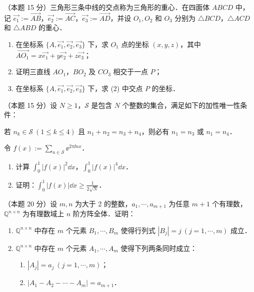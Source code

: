 
\begin{problems}

\item[一、]（本题 15 分）三角形三条中线的交点称为三角形的重心．在四面体 $ABCD$ 中，记 $\overrightarrow{e_1}:=\overrightarrow{AB}$，$\overrightarrow{e_2}:=\overrightarrow{AC}$，$\overrightarrow{e_3}:=\overrightarrow{AD}$，并设 $O_1,O_2$ 和 $O_3$ 分别为 $\triangle BCD$，$\triangle ACD$ 和 $\triangle ABD$ 的重心．
\begin{enumerate}[label=(\arabic*)]
  \item 在坐标系 $\{A,\overrightarrow{e_1},\overrightarrow{e_2},\overrightarrow{e_3}\}$ 下，求 $O_1$ 点的坐标 $(x,y,z)$，其中 $\overrightarrow{AO_1}=x\overrightarrow{e_1}+y\overrightarrow{e_2}+z\overrightarrow{e_3}$；
  \item 证明三直线 $AO_1$，$BO_2$ 及 $CO_3$ 相交于一点 $P$；
  \item 在坐标系 $\{A,\overrightarrow{e_1},\overrightarrow{e_2},\overrightarrow{e_3}\}$ 下，求 (2) 中交点 $P$ 的坐标．
\end{enumerate}

\item[二、]（本题 15 分）设 $N\geqslant 1$，$\mathcal{S}$ 是包含 $N$ 个整数的集合，满足如下的加性唯一性条件：

若 $n_k\in\mathcal{S}\ (1\leqslant k\leqslant 4)$ 且 $n_1+n_2=n_3+n_4$，则必有 $n_1=n_3$ 或 $n_1=n_4$．

令 $f(x):=\sum\limits_{n\in\mathcal{S}}\ee^{2\pi\ii nx}$．
\begin{enumerate}[label=(\arabic*)]
  \item 计算 $\displaystyle\int_0^1|f(x)|^2\dd x$，$\displaystyle\int_0^1|f(x)|^4\dd x$．
  \item 证明：$\displaystyle\int_0^1|f(x)|\dd x\geqslant\frac{1}{2\sqrt{N}}$．
\end{enumerate}

\item[三、]（本题 20 分）设 $m,n$ 为大于 2 的整数，$a_1,\cdots,a_{m+1}$ 为任意 $m+1$ 个有理数，$\mathbb{Q}^{n\times n}$ 为有理数域上 $n$ 阶方阵全体．证明：
\begin{enumerate}[label=(\arabic*)]
  \item $\mathbb{Q}^{n\times n}$ 中存在 $m$ 个元素 $B_1,\cdots,B_m$ 使得行列式 $|B_j|=j\ (j=1,\cdots,m)$ 成立．
  \item $\mathbb{Q}^{n\times n}$ 中存在 $m$ 个元素 $A_1,\cdots,A_m$ 使得下列两条同时成立：
  \begin{enumerate}[label=(\roman*)]
    \item $|A_j|=a_j\ (j=1,\cdots,m)$；
    \item $|A_1-A_2-\cdots-A_m|=a_{m+1}$．
  \end{enumerate}
\end{enumerate}


\end{problems}
